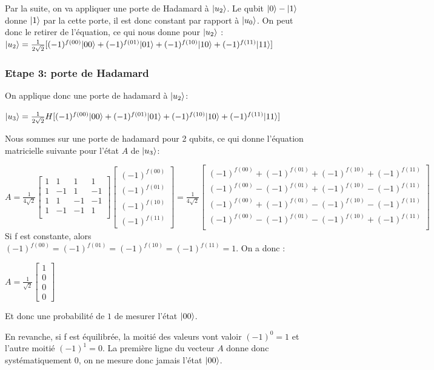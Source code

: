 \documentclass[12pt,a4paper]{article}
\DeclarePairedDelimiter\ket{\lvert}{\rangle}
\begin{document}
Par la suite, on va appliquer une porte de Hadamard à $\ket{u_2}$. Le qubit $\ket{0} - \ket{1}$ donne $\ket{1}$ par la cette porte, il est donc constant par rapport à $\ket{u_0}$. On peut donc le retirer de l'équation, ce qui nous donne pour $\ket{u_2}$ :
\medbreak
$
\ket{u_2} = \frac{1}{2\sqrt{2}}[(-1)^{f(00)} \ket{00} + (-1)^{f(01)} \ket{01} + (-1)^{f(10)} \ket{10} + (-1)^{f(11)} \ket{11} ]
$

\subsubsection{Etape 3: porte de Hadamard}

On applique donc une porte de hadamard à $\ket{u_2}$:

$
\ket{u_3} = \frac{1}{2\sqrt{2}} H [(-1)^{f(00)} \ket{00} + (-1)^{f(01)} \ket{01} + (-1)^{f(10)} \ket{10} + (-1)^{f(11)} \ket{11} ]
$

Nous sommes sur une porte de hadamard pour 2 qubits, ce qui donne l'équation matricielle suivante pour l'état $A$ de $\ket{u_3}$:

$
A=
\frac{1}{4\sqrt{2}} 
\begin{bmatrix}
  1 & 1 & 1 & 1 \\
  1 & -1 & 1 & -1 \\
  1 & 1 & -1 & -1 \\
  1 & -1 & -1 & 1 \\
\end{bmatrix}
\begin{bmatrix}
  (-1)^{f(00)} \\ (-1)^{f(01)} \\ (-1)^{f(10)} \\ (-1)^{f(11)}
\end{bmatrix}=
\frac{1}{4\sqrt{2}} 
\begin{bmatrix}
  (-1)^{f(00)} + (-1)^{f(01)} + (-1)^{f(10)} + (-1)^{f(11)} \\
  (-1)^{f(00)} - (-1)^{f(01)} + (-1)^{f(10)} - (-1)^{f(11)} \\
  (-1)^{f(00)} + (-1)^{f(01)} - (-1)^{f(10)} - (-1)^{f(11)} \\
  (-1)^{f(00)} - (-1)^{f(01)} - (-1)^{f(10)} + (-1)^{f(11)} \\
\end{bmatrix}
$
\medbreak
Si f est constante, alors $(-1)^{f(00)} = (-1)^{f(01)} = (-1)^{f(10)} = (-1)^{f(11)} = 1$. On a donc : 

$
A=
\frac{1}{\sqrt{2}} 
\begin{bmatrix}
  1 \\ 0 \\ 0 \\ 0
\end{bmatrix}
$

Et donc une probabilité de $1$ de mesurer l'état $\ket{00}$.

\medbreak
En revanche, si f est équilibrée, la moitié des valeurs vont valoir $(-1)^{0} = 1$ et l'autre moitié $(-1)^{1} = 0$. La première ligne du vecteur $A$ donne donc systématiquement 0, on ne mesure donc jamais l'état $\ket{00}$.

\medbreak
\end{document}
